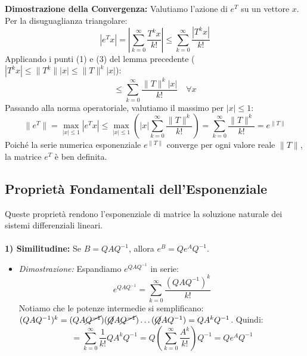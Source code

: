\documentclass[openany]{book}
\theoremstyle{definition}
\theoremstyle{remark}
\begin{document}
\textbf{Dimostrazione della Convergenza:}
Valutiamo l'azione di $e^T$ su un vettore $x$. Per la disuguaglianza triangolare:
\begin{equation}
    |e^T x| = \left| \sum_{k=0}^{\infty} \frac{T^k x}{k!} \right| \le \sum_{k=0}^{\infty} \frac{|T^k x|}{k!}
\end{equation}
Applicando i punti (1) e (3) del lemma precedente ($|T^k x| \le \|T^k\| |x| \le \|T\|^k |x|$):
\begin{equation}
    \le \sum_{k=0}^{\infty} \frac{\|T\|^k |x|}{k!} \quad \forall x
\end{equation}
Passando alla norma operatoriale, valutiamo il massimo per $|x| \le 1$:
\begin{equation}
    \|e^T\| = \max_{|x| \le 1} |e^T x| \le \max_{|x| \le 1} \left( |x| \sum_{k=0}^{\infty} \frac{\|T\|^k}{k!} \right) = \sum_{k=0}^{\infty} \frac{\|T\|^k}{k!} = e^{\|T\|}
\end{equation}
Poiché la serie numerica esponenziale $e^{\|T\|}$ converge per ogni valore reale $\|T\|$, la matrice $e^T$ è ben definita.

\subsection*{Proprietà Fondamentali dell'Esponenziale}

Queste proprietà rendono l'esponenziale di matrice la soluzione naturale dei sistemi differenziali lineari.
\\
\\
\textbf{1) Similitudine:} Se $B = Q A Q^{-1}$, allora $e^B = Q e^A Q^{-1}$.
\begin{itemize}
    \item[] \textit{Dimostrazione:} Espandiamo $e^{QAQ^{-1}}$ in serie:
    \begin{equation*}
        e^{QAQ^{-1}} = \sum_{k=0}^{\infty} \frac{(QAQ^{-1})^k}{k!}
    \end{equation*}
    Notiamo che le potenze intermedie si semplificano: 
    $(QAQ^{-1})^k = (QA\cancel{Q^{-1}})(\cancel{Q}A\cancel{Q^{-1}})\dots(\cancel{Q}AQ^{-1}) = QA^kQ^{-1}$.
    Quindi:
    \begin{equation*}
         = \sum_{k=0}^{\infty} \frac{1}{k!} Q A^k Q^{-1} = Q \left( \sum_{k=0}^{\infty} \frac{A^k}{k!} \right) Q^{-1} = Q e^A Q^{-1}
    \end{equation*}
\end{itemize}
\end{document}
